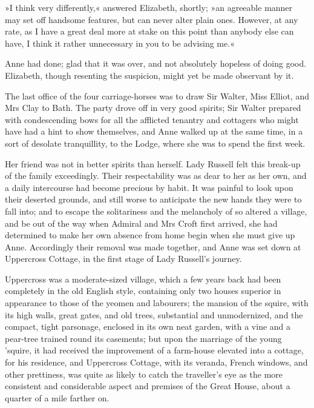 »I think very differently,« answered Elizabeth, shortly; »an agreeable manner may set off handsome features, but can never alter plain ones. However, at any rate, as I have a great deal more at stake on this point than anybody else can have, I think it rather unnecessary in you to be advising me.«

Anne had done; glad that it was over, and not absolutely hopeless of doing good. Elizabeth, though resenting the suspicion, might yet be made observant by it.

The last office of the four carriage-horses was to draw Sir Walter, Miss Elliot, and Mrs Clay to Bath. The party drove off in very good spirits; Sir Walter prepared with condescending bows for all the afflicted tenantry and cottagers who might have had a hint to show themselves, and Anne walked up at the same time, in a sort of desolate tranquillity, to the Lodge, where she was to spend the first week.

Her friend was not in better spirits than herself. Lady Russell felt this break-up of the family exceedingly. Their respectability was as dear to her as her own, and a daily intercourse had become precious by habit. It was painful to look upon their deserted grounds, and still worse to anticipate the new hands they were to fall into; and to escape the solitariness and the melancholy of so altered a village, and be out of the way when Admiral and Mrs Croft first arrived, she had determined to make her own absence from home begin when she must give up Anne. Accordingly their removal was made together, and Anne was set down at Uppercross Cottage, in the first stage of Lady Russell's journey.

Uppercross was a moderate-sized village, which a few years back had been completely in the old English style, containing only two houses superior in appearance to those of the yeomen and labourers; the mansion of the squire, with its high walls, great gates, and old trees, substantial and unmodernized, and the compact, tight parsonage, enclosed in its own neat garden, with a vine and a pear-tree trained round its casements; but upon the marriage of the young 'squire, it had received the improvement of a farm-house elevated into a cottage, for his residence, and Uppercross Cottage, with its veranda, French windows, and other prettiness, was quite as likely to catch the traveller's eye as the more consistent and considerable aspect and premises of the Great House, about a quarter of a mile farther on.

